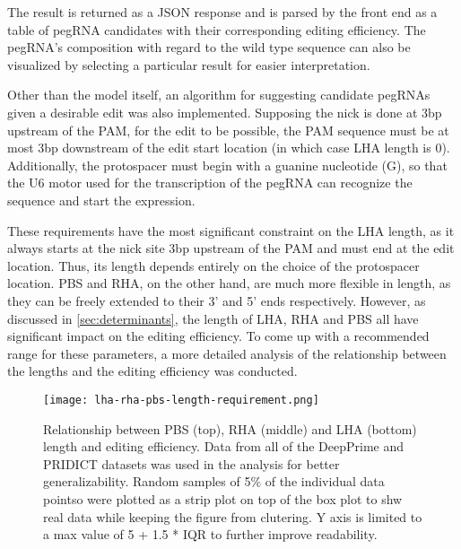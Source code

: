The result is returned as a JSON response and is parsed by the front end as a table of pegRNA candidates with their corresponding editing efficiency. The pegRNA's composition with regard to the wild type sequence can also be visualized by selecting a particular result for easier interpretation.

Other than the model itself, an algorithm for suggesting candidate pegRNAs given a desirable edit was also implemented. Supposing the nick is done at 3bp upstream of the PAM, for the edit to be possible, the PAM sequence must be at most 3bp downstream of the edit start location (in which case LHA length is 0). Additionally, the protospacer must begin with a guanine nucleotide (G), so that the U6 motor used for the transcription of the pegRNA can recognize the sequence and start the expression\cite{hsieh-fengEfficientExpressionMultiple2020}.

These requirements have the most significant constraint on the LHA length, as it always starts at the nick site 3bp upstream of the PAM and must end at the edit location. Thus, its length depends entirely on the choice of the protospacer location. PBS and RHA, on the other hand, are much more flexible in length, as they can be freely extended to their 3' and 5' ends respectively.
However, as discussed in \autoref{sec:determinants}, the length of LHA, RHA and PBS all have significant impact on the editing efficiency. To come up with a recommended range for these parameters, a more detailed analysis of the relationship between the lengths and the editing efficiency was conducted.

\begin{figure}
    \texttt{[image: lha-rha-pbs-length-requirement.png]}
    \caption[Relationship between LHA, RHA and PBS length and editing efficiency]{Relationship between PBS (top), RHA (middle) and LHA (bottom) length and editing efficiency. Data from all of the DeepPrime and PRIDICT datasets was used in the analysis for better generalizability. Random samples of 5\% of the individual data pointso were plotted as a strip plot on top of the box plot to shw real data while keeping the figure from clutering. Y axis is limited to a max value of 5 + 1.5 * IQR to further improve readability. }
    \label{fig:lha-rha-pbs-length}
\end{figure}


